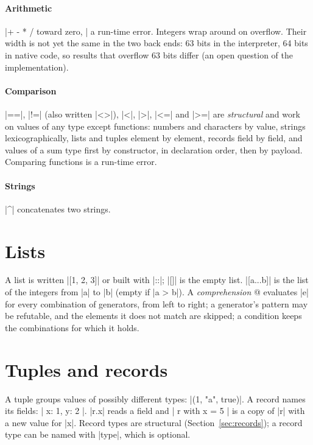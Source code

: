 \paragraph{Arithmetic} \fc|+ - * / %
toward zero, \fc|%
a run-time error.\label{sec:int-width}
Integers wrap around on overflow. Their width is not yet the same in the two
back ends: 63 bits in the interpreter, 64 bits in native code, so results
that overflow 63 bits differ (an open question of the implementation).

\paragraph{Comparison} \fc|==|, \fc|!=| (also written \fc|<>|), \fc|<|,
\fc|>|, \fc|<=| and \fc|>=| are \emph{structural} and work on values of any
type except functions: numbers and characters by value, strings
lexicographically, lists and tuples element by element, records field by
field, and values of a sum type first by constructor, in declaration order,
then by payload. Comparing functions is a run-time error.

\paragraph{Strings} \fc|^| concatenates two strings.


\section{Lists}
A list is written \fc|[1, 2, 3]| or built with \fc|::|; \fc|[]| is the
empty list. \fc|[a...b]| is the list of the integers from \fc|a| to \fc|b|
(empty if \fc|a > b|). A \emph{comprehension}
\fc@[e | p <- xs, cond, q <- ys]@ evaluates \fc|e| for every combination of
generators, from left to right; a generator's pattern may be refutable, and
the elements it does not match are skipped; a condition keeps the
combinations for which it holds.


\section{Tuples and records}
A tuple groups values of possibly different types: \fc|(1, "a", true)|. A
record names its fields: \fc|{ x: 1, y: 2 }|. \fc|r.x| reads a field and
\fc|{ r with x = 5 }| is a copy of \fc|r| with a new value for \fc|x|. Record
types are structural (Section~\ref{sec:records}); a record type can be
named with \fc|type|, which is optional.

